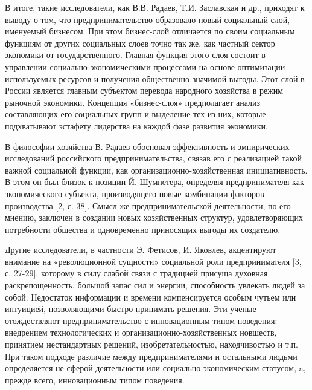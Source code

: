 \documentclass[a4paper, 12pt]{article}%
\begin{document}
В итоге, такие исследователи, как В.В. Радаев, Т.И. Заславская и др., приходят к выводу о том, что предпринимательство образовало новый социальный слой, именуемый бизнесом. При этом бизнес-слой отличается по своим социальным функциям от других социальных слоев точно так же, как частный сектор экономики от государственного. Главная функция этого слоя состоит в управлении социально-экономическими процессами на основе оптимизации используемых ресурсов и получения общественно значимой выгоды. Этот слой в России является главным субъектом перевода народного хозяйства в режим рыночной экономики. Концепция «бизнес-слоя» предполагает анализ составляющих его социальных групп и выделение тех из них, которые подхватывают эстафету лидерства на каждой фазе развития экономики.

В философии хозяйства В. Радаев обосновал эффективность и эмпирических исследований российского предпринимательства, связав его с реализацией такой важной социальной функции, как организационно-хозяйственная инициативность. В этом он был близок к позиции Й. Шумпетера, определяя предпринимателя как экономического субъекта, производящего новые комбинации факторов производства [2, с. 38]. Смысл же предпринимательской деятельности, по его мнению, заключен в создании новых хозяйственных структур, удовлетворяющих потребности общества и одновременно приносящих выгоды их создателю.

Другие исследователи, в частности Э. Фетисов, И. Яковлев, акцентируют внимание на «революционной сущности» социальной роли предпринимателя [3, с. 27-29], которому в силу слабой связи с традицией присуща духовная раскрепощенность, большой запас сил и энергии, способность увлекать людей за собой. Недостаток информации и времени компенсируется особым чутьем или интуицией, позволяющими быстро принимать решения. Эти ученые отождествляют предпринимательство с инновационным типом поведения: внедрением технологических и организационно-хозяйственных новшеств, принятием нестандартных решений, изобретательностью, находчивостью и т.п. При таком подходе различие между предпринимателями и остальными людьми определяется не сферой деятельности или социально-экономическим статусом, a, прежде всего, инновационным типом поведения.
\end{document}
